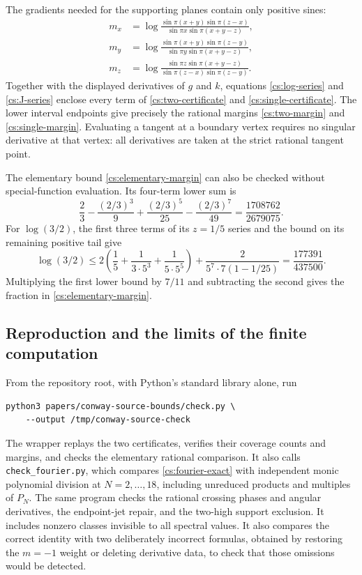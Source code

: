 The gradients needed for the supporting planes contain only positive sines:
\begin{align*}
 m_x&=\log\frac{\sin\pi(x+y)\sin\pi(z-x)}
                     {\sin\pi x\sin\pi(x+y-z)},\\
 m_y&=\log\frac{\sin\pi(x+y)\sin\pi(z-y)}
                     {\sin\pi y\sin\pi(x+y-z)},\\
 m_z&=\log\frac{\sin\pi z\sin\pi(x+y-z)}
                     {\sin\pi(z-x)\sin\pi(z-y)}.
\end{align*}
Together with the displayed derivatives of $g$ and $k$, equations \eqref{cs:log-series} and \eqref{cs:J-series} enclose every term of \eqref{cs:two-certificate} and \eqref{cs:single-certificate}. The lower interval endpoints give precisely the rational margins \eqref{cs:two-margin} and \eqref{cs:single-margin}. Evaluating a tangent at a boundary vertex requires no singular derivative at that vertex: all derivatives are taken at the strict rational tangent point.

The elementary bound \eqref{cs:elementary-margin} can also be checked without special-function evaluation. Its four-term lower sum is
\[
 \frac23-\frac{(2/3)^3}{9}+\frac{(2/3)^5}{25}
 -\frac{(2/3)^7}{49}=\frac{1708762}{2679075}.
\]
For $\log(3/2)$, the first three terms of its $z=1/5$ series and the bound on its remaining positive tail give
\[
 \log(3/2)\le
 2\left(\frac15+\frac{1}{3\cdot5^3}+\frac{1}{5\cdot5^5}\right)
 +\frac{2}{5^7\cdot7(1-1/25)}
 =\frac{177391}{437500}.
\]
Multiplying the first lower bound by $7/11$ and subtracting the second gives the fraction in \eqref{cs:elementary-margin}.

\subsection{Reproduction and the limits of the finite computation}
From the repository root, with Python's standard library alone, run
\begin{verbatim}
python3 papers/conway-source-bounds/check.py \
    --output /tmp/conway-source-check
\end{verbatim}
The wrapper replays the two certificates, verifies their coverage counts
and margins, and checks the elementary rational comparison. It also
calls \texttt{check\_fourier.py}, which compares
\eqref{cs:fourier-exact} with independent monic polynomial division
at \(N=2,\ldots,18\), including unreduced products and multiples of
\(P_N\). The same program checks the rational crossing phases and
angular derivatives, the endpoint-jet repair, and the two-high support
exclusion. It includes nonzero classes invisible to all spectral values.
It also compares the correct identity with two deliberately incorrect
formulas, obtained by restoring the $m=-1$ weight or deleting derivative
data, to check that those omissions would be detected.

